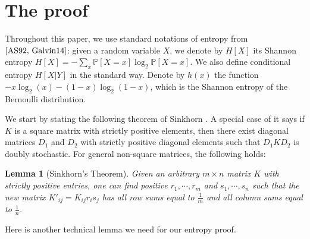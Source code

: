 \documentclass{article}
\newtheorem{lemma}[theorem]{Lemma}
\begin{document}
\section{The proof}
Throughout this paper, we use standard notations of entropy from $\cite{AS92, Galvin14}$: given a random variable $X$, we denote by $H[X]$ its Shannon entropy $H[X]=-\sum_x \mathbb{P}[X=x]\log_2 \mathbb{P}[X=x]$. We also define conditional entropy $H[X|Y]$ in the standard way. Denote by $h(x)$ the function $-x\log_2(x)-(1-x)\log_2(1-x)$, which is the Shannon entropy of the Bernoulli distribution.

We start by stating the following theorem of Sinkhorn \cite{Sinkhorn64}. A special case of it says if $K$ is a square matrix with strictly positive elements, then there exist diagonal matrices $D_1$ and $D_2$ with strictly positive diagonal elements such that $D_1 K D_2$ is doubly stochastic. For general non-square matrices, the following holds:
\begin{lemma}[Sinkhorn's Theorem]
Given an arbitrary $m \times n$ matrix $K$ with strictly positive entries, one can find positive $r_1, \cdots, r_m$ and $s_1, \cdots, s_n$ such that the new matrix $K'_{ij}=K_{ij}r_is_j$ has all row sums equal to $\frac{1}{m}$ and all column sums equal to $\frac{1}{n}$.
\end{lemma}

Here is another technical lemma we need for our entropy proof.
\end{document}
